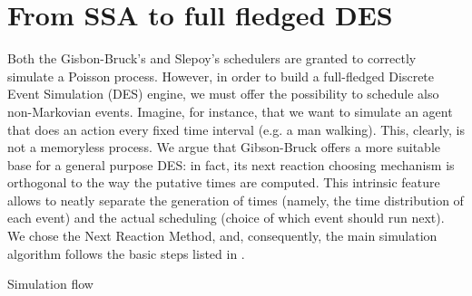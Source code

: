 \documentclass[12pt,a4paper,twoside,openright]{book}
\begin{document}
\section{From SSA to full fledged DES}

Both the Gisbon-Bruck's and Slepoy's schedulers are granted to correctly simulate a Poisson process.
%
However, in order to build a full-fledged Discrete Event Simulation (DES) engine, we must offer the possibility to schedule also non-Markovian events.
%
Imagine, for instance, that we want to simulate an agent that does an action every fixed time interval (e.g. a man walking).
%
This, clearly, is not a memoryless process.
%
We argue that Gibson-Bruck offers a more suitable base for a general purpose DES: in fact, its next reaction choosing mechanism is orthogonal to the way the putative times are computed.
%
This intrinsic feature allows to neatly separate the generation of times (namely, the time distribution of each event) and the actual scheduling (choice of which event should run next).
%
We chose the Next Reaction Method, and, consequently, the main simulation algorithm follows the basic steps listed in .

\begin{algorithm}
\begin{distribalgo}[1]
\vspace{5pt}
  \ENDFOR
\ENDFOR
{}
      \ENDFOR
    \ENDIF
\ENDWHILE
\caption{Simulation flow}
\label{algo:engine}
\end{distribalgo}
\end{algorithm}
\end{document}
